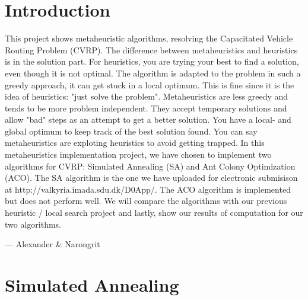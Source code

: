 \documentclass[12pt]{article}
\begin{document}

\tableofcontents
\pagebreak


\section{Introduction}

This project shows metaheuristic algorithms, resolving the Capacitated Vehicle Routing Problem (CVRP). The difference between metaheuristics and heuristics is in 
the solution part. For heuristics, you are trying your best to find a solution, even though it is not optimal. The algorithm is adapted to the problem
in such a greedy approach, it can get stuck in a local optimum. This is fine since it is the idea of heuristics: "just solve the problem". 
\newline
Metaheuristics are less greedy and tends to be more problem independent. They accept temporary solutions and allow "bad" steps as an attempt to get
a better solution. You have a local- and global optimum to keep track of the best solution found. You can say metaheuristics are exploting
heuristics to avoid getting trapped. 
\newline
In this metaheuristics implementation project, we have chosen to implement two algorithms for CVRP: Simulated Annealing (SA) and Ant Colony Optimization (ACO). 
The SA algorithm is the one we have uploaded for electronic submisison at http://valkyria.imada.sdu.dk/D0App/. The ACO algorithm is implemented but does not perform well.
We will compare the algorithms with our previous heuristic / local search project and lastly, show our results of computation for our two algorithms.

\hspace{1 cm}--- Alexander \& Narongrit

\newpage

\section{Simulated Annealing} 
\end{document}
